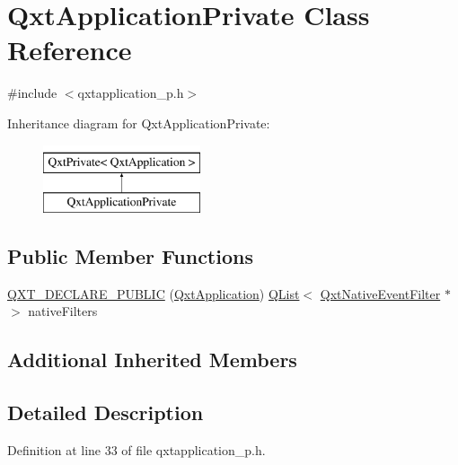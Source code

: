 \hypertarget{class_qxt_application_private}{\section{Qxt\-Application\-Private Class Reference}
\label{class_qxt_application_private}
}


{\ttfamily \#include $<$qxtapplication\-\_\-p.\-h$>$}

Inheritance diagram for Qxt\-Application\-Private\-:\begin{figure}[H]
\begin{center}
\leavevmode
\includegraphics[height=2.000000cm]{class_qxt_application_private}
\end{center}
\end{figure}
\subsection*{Public Member Functions}
\begin{DoxyCompactItemize}
\item 
\hyperlink{class_qxt_application_private_ae96b961479a93a6799ceea457acb7d9c}{Q\-X\-T\-\_\-\-D\-E\-C\-L\-A\-R\-E\-\_\-\-P\-U\-B\-L\-I\-C} (\hyperlink{class_qxt_application}{Qxt\-Application}) \hyperlink{class_q_list}{Q\-List}$<$ \hyperlink{class_qxt_native_event_filter}{Qxt\-Native\-Event\-Filter} $\ast$ $>$ native\-Filters
\end{DoxyCompactItemize}
\subsection*{Additional Inherited Members}


\subsection{Detailed Description}


Definition at line 33 of file qxtapplication\-\_\-p.\-h.



